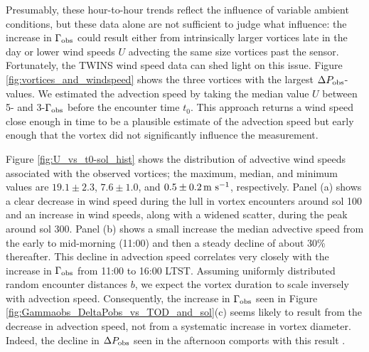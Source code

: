 \documentclass{aastex63}
\begin{document}
Presumably, these hour-to-hour trends reflect the influence of variable ambient conditions, but these data alone are not sufficient to judge what influence: the increase in $\Gamma_{\rm obs}$ could result either from intrinsically larger vortices late in the day or lower wind speeds $U$ advecting the same size vortices past the sensor. Fortunately, the TWINS wind speed data can shed light on this issue. Figure \ref{fig:vortices_and_windspeed} shows the three vortices with the largest $\Delta P_{\rm obs}$-values. We estimated the advection speed by taking the median value $U$ between 5- and 3-$\Gamma_{\rm obs}$ before the encounter time $t_0$. This approach returns a wind speed close enough in time to be a plausible estimate of the advection speed but early enough that the vortex did not significantly influence the measurement. 

Figure \ref{fig:U_vs_t0-sol_hist} shows the distribution of advective wind speeds associated with the observed vortices; the maximum, median, and minimum values are $19.1\pm2.3$, $7.6\pm1.0$, and $0.5\pm0.2 \,{\rm m\ s^{-1}}$, respectively. Panel (a) shows a clear decrease in wind speed during the lull in vortex encounters around sol 100 and an increase in wind speeds, along with a widened scatter, during the peak around sol 300. Panel (b) shows a small increase the median advective speed from the early to mid-morning (11:00) and then a steady decline of about 30\% thereafter. This decline in advection speed correlates very closely with the increase in $\Gamma_{\rm obs}$ from 11:00 to 16:00 LTST. Assuming uniformly distributed random encounter distances $b$, we expect the vortex duration to scale inversely with advection speed. Consequently, the increase in $\Gamma_{\rm obs}$ seen in Figure \ref{fig:Gammaobs_DeltaPobs_vs_TOD_and_sol}(c) seems likely to result from the decrease in advection speed, not from a systematic increase in vortex diameter. Indeed, the decline in $\Delta P_{\rm obs}$ seen in the afternoon comports with this result \citep{2020Icar..33813523J}.
\end{document}
